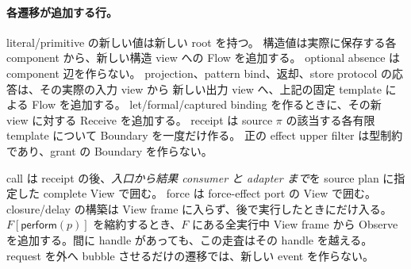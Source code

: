 \documentclass[11pt,a4paper]{article}
\begin{document}
\paragraph{各遷移が追加する行。}
literal/primitive の新しい値は新しい root を持つ。
構造値は実際に保存する各 component から、新しい構造 view への Flow を追加する。
optional absence は component 辺を作らない。
projection、pattern bind、返却、store protocol の応答は、その実際の入力 view から
新しい出力 view へ、上記の固定 template による Flow を追加する。
let/formal/captured binding を作るときに、その新 view に対する Receive を追加する。
receipt は source \(\pi\) の該当する各有限 template について Boundary を一度だけ作る。
正の effect upper filter は型制約であり、grant の Boundary を作らない。

call は receipt の後、\emph{入口から結果 consumer と adapter まで}を
source plan に指定した complete View で囲む。
force は force-effect port の View で囲む。
closure/delay の構築は View frame に入らず、後で実行したときにだけ入る。
\(F[\mathsf{perform}(p)]\) を縮約するとき、\(F\) にある全実行中 View frame から
Observe を追加する。間に handle があっても、この走査はその handle を越える。
request を外へ bubble させるだけの遷移では、新しい event を作らない。
\end{document}
